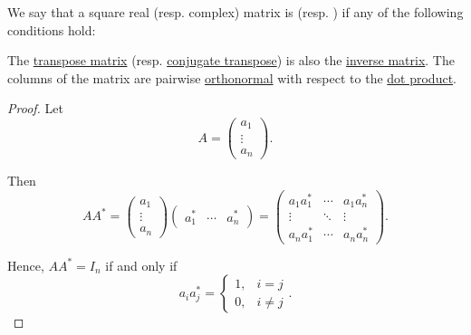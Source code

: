 \begin{definition}\label{def:unitary_matrix}
  We say that a square real (resp. complex) matrix is  (resp. ) if any of the following conditions hold:
  \begin{thmenum}
     The \hyperref[def:transpose_matrix]{transpose matrix} (resp. \hyperref[def:conjugate_transpose]{conjugate transpose}) is also the \hyperref[def:inverse_matrix]{inverse matrix}.
     The columns of the matrix are pairwise \hyperref[def:orthogonality]{orthonormal} with respect to the \hyperref[def:inner_product_space]{dot product}.
  \end{thmenum}
\end{definition}
\begin{proof}
   Let
  \begin{equation*}
    A = \begin{pmatrix} a_1 \\ \vdots \\ a_n \end{pmatrix}.
  \end{equation*}

  Then
  \begin{equation*}
    A A^*
    =
    \begin{pmatrix} a_1 \\ \vdots \\ a_n \end{pmatrix}
    \begin{pmatrix} a_1^* & \cdots & a_n^* \end{pmatrix}
    =
    \begin{pmatrix}
      a_1 a_1^*  & \cdots & a_1 a_n^* \\
      \vdots     & \ddots & \vdots \\
      a_n a_1^*  & \cdots & a_n a_n^*
    \end{pmatrix}.
  \end{equation*}

  Hence, \( A A^* = I_n \) if and only if
  \begin{equation*}
    a_i a_j^* = \begin{cases}
      1, &i = j \\
      0, &i \neq j
    \end{cases}.
  \end{equation*}
\end{proof}


